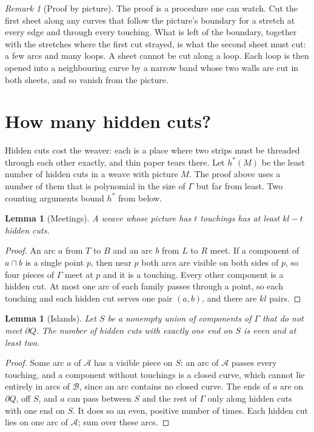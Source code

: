 \documentclass[11pt,a4paper]{article}
\newtheorem{lemma}[theorem]{Lemma}
\theoremstyle{definition}
\theoremstyle{remark}
\newtheorem{remark}[theorem]{Remark}
\newcommand{\A}{\mathcal{A}}
\newcommand{\B}{\mathcal{B}}
\newcommand{\bd}{\partial}
\begin{document}
\begin{remark}[Proof by picture]
The proof is a procedure one can watch. Cut the first sheet along any
curves that follow the picture's boundary for a stretch at every edge and
through every touching. What is left of the boundary, together with the
stretches where the first cut strayed, is what the second sheet must cut:
a few arcs and many loops. A sheet cannot be cut along a loop. Each loop
is then opened into a neighbouring curve by a narrow band whose two walls
are cut in both sheets, and so vanish from the picture.
\end{remark}

\section{How many hidden cuts?}

Hidden cuts cost the weaver: each is a place where two strips must be
threaded through each other exactly, and thin paper tears there. Let
$h^*(M)$ be the least number of hidden cuts in a weave with picture $M$.
The proof above uses a number of them that is polynomial in the size of
$\Gamma$ but far from least. Two counting arguments bound $h^*$ from below.

\begin{lemma}[Meetings]\label{lem:meet}
A weave whose picture has $t$ touchings has at least $kl-t$ hidden cuts.
\end{lemma}
\begin{proof}
An arc $a$ from $T$ to $B$ and an arc $b$ from $L$ to $R$ meet. If a
component of $a\cap b$ is a single point $p$, then near $p$ both arcs are
visible on both sides of $p$, so four pieces of $\Gamma$ meet at $p$ and it
is a touching. Every other component is a hidden cut. At most one arc of
each family passes through a point, so each touching and each hidden cut
serves one pair $(a,b)$, and there are $kl$ pairs.
\end{proof}

\begin{lemma}[Islands]\label{lem:island}
Let $S$ be a nonempty union of components of $\Gamma$ that do not meet
$\bd Q$. The number of hidden cuts with exactly one end on $S$ is even and
at least two.
\end{lemma}
\begin{proof}
Some arc $a$ of $\A$ has a visible piece on $S$: an arc of $\A$ passes
every touching, and a component without touchings is a closed curve, which
cannot lie entirely in arcs of $\B$, since an arc contains no closed
curve. The ends of $a$ are on $\bd Q$,
off $S$, and $a$ can pass between $S$ and the rest of $\Gamma$ only along
hidden cuts with one end on $S$. It does so an even, positive number of
times. Each hidden cut lies on one arc of $\A$; sum over these arcs.
\end{proof}
\end{document}
